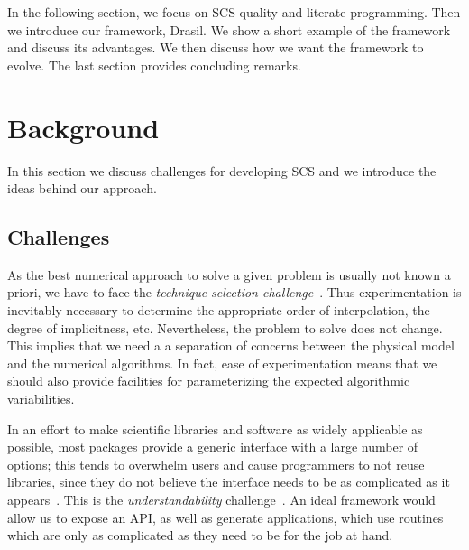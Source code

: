 \documentclass{sig-alternate-05-2015}
\newcommand{\lss}{Drasil}
\begin{document}
In the following section, we  
focus on SCS quality and literate programming.
Then we introduce our framework, \lss{}.  We show
a short example of the framework and discuss its advantages. 
We then discuss how we want the framework to evolve. %
The last section provides concluding remarks.

\section{Background} \label{sec:background}

In this section we discuss challenges for developing SCS and we
introduce the ideas behind our approach.

\subsection{Challenges} \label{ssec:challenges}

As the best numerical approach to solve a given problem is usually not known
a priori, we have to face the \textit{technique selection
challenge}~\cite{Yu2011}. Thus experimentation is inevitably necessary to
determine the appropriate order of interpolation, the degree of implicitness,
etc. Nevertheless, the problem to solve does not change.  This implies that
we need a a separation of concerns between the physical model and the numerical
algorithms.  In fact, ease of experimentation means that we should also 
provide facilities for parameterizing the expected algorithmic variabilities.

In an effort to make scientific libraries and software as widely applicable as
possible, most packages provide a generic interface with a large number of
options; this tends to overwhelm users and cause programmers to not reuse
libraries, since they do not believe the interface needs to be as complicated
as it appears~\cite{Dubois2002}. This is the \textit{understandability}
challenge~\cite{Yu2011}.  An ideal framework would allow us to expose an
API, as well as generate applications, which use routines which are only as
complicated as they need to be for the job at hand.
\end{document}
